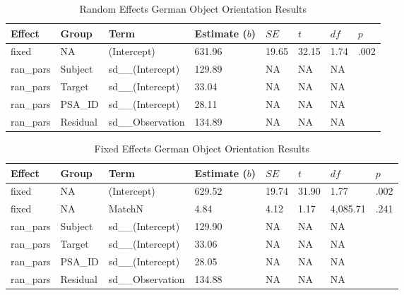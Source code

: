 \documentclass[
  man,floatsintext]{apa7}
\begin{document}
\begin{table}[tbp]

\begin{center}
\begin{threeparttable}

\caption{\label{tab:german-random}Random Effects German Object Orientation Results}

\begin{tabular}{llllllll}
\toprule
Effect & Group & Term & Estimate ($b$) & $SE$ & $t$ & $df$ & $p$\\
\midrule
fixed & NA & (Intercept) & 631.96 & 19.65 & 32.15 & 1.74 & .002\\
ran\_pars & Subject & sd\_\_(Intercept) & 129.89 & NA & NA & NA & \\
ran\_pars & Target & sd\_\_(Intercept) & 33.04 & NA & NA & NA & \\
ran\_pars & PSA\_ID & sd\_\_(Intercept) & 28.11 & NA & NA & NA & \\
ran\_pars & Residual & sd\_\_Observation & 134.89 & NA & NA & NA & \\
\bottomrule
\end{tabular}

\end{threeparttable}
\end{center}

\end{table}

\begin{table}[tbp]

\begin{center}
\begin{threeparttable}

\caption{\label{tab:german-fixed}Fixed Effects German Object Orientation Results}

\begin{tabular}{llllllll}
\toprule
Effect & Group & Term & Estimate ($b$) & $SE$ & $t$ & $df$ & $p$\\
\midrule
fixed & NA & (Intercept) & 629.52 & 19.74 & 31.90 & 1.77 & .002\\
fixed & NA & MatchN & 4.84 & 4.12 & 1.17 & 4,085.71 & .241\\
ran\_pars & Subject & sd\_\_(Intercept) & 129.90 & NA & NA & NA & \\
ran\_pars & Target & sd\_\_(Intercept) & 33.06 & NA & NA & NA & \\
ran\_pars & PSA\_ID & sd\_\_(Intercept) & 28.05 & NA & NA & NA & \\
ran\_pars & Residual & sd\_\_Observation & 134.88 & NA & NA & NA & \\
\bottomrule
\end{tabular}

\end{threeparttable}
\end{center}

\end{table}
\end{document}
